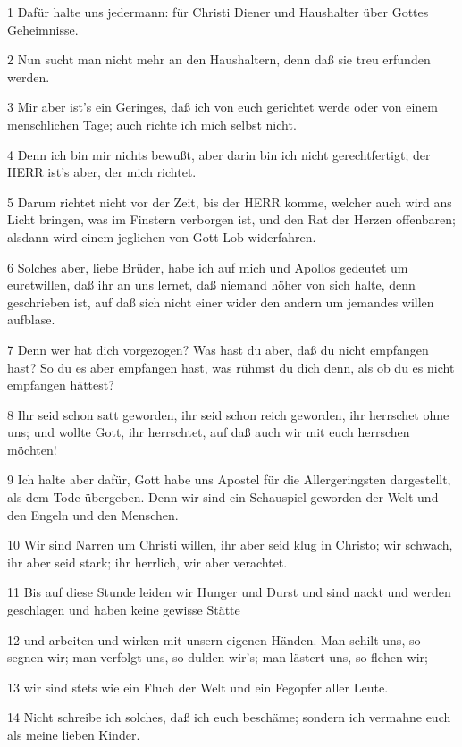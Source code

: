 \par 1 Dafür halte uns jedermann: für Christi Diener und Haushalter über Gottes Geheimnisse.
\par 2 Nun sucht man nicht mehr an den Haushaltern, denn daß sie treu erfunden werden.
\par 3 Mir aber ist's ein Geringes, daß ich von euch gerichtet werde oder von einem menschlichen Tage; auch richte ich mich selbst nicht.
\par 4 Denn ich bin mir nichts bewußt, aber darin bin ich nicht gerechtfertigt; der HERR ist's aber, der mich richtet.
\par 5 Darum richtet nicht vor der Zeit, bis der HERR komme, welcher auch wird ans Licht bringen, was im Finstern verborgen ist, und den Rat der Herzen offenbaren; alsdann wird einem jeglichen von Gott Lob widerfahren.
\par 6 Solches aber, liebe Brüder, habe ich auf mich und Apollos gedeutet um euretwillen, daß ihr an uns lernet, daß niemand höher von sich halte, denn geschrieben ist, auf daß sich nicht einer wider den andern um jemandes willen aufblase.
\par 7 Denn wer hat dich vorgezogen? Was hast du aber, daß du nicht empfangen hast? So du es aber empfangen hast, was rühmst du dich denn, als ob du es nicht empfangen hättest?
\par 8 Ihr seid schon satt geworden, ihr seid schon reich geworden, ihr herrschet ohne uns; und wollte Gott, ihr herrschtet, auf daß auch wir mit euch herrschen möchten!
\par 9 Ich halte aber dafür, Gott habe uns Apostel für die Allergeringsten dargestellt, als dem Tode übergeben. Denn wir sind ein Schauspiel geworden der Welt und den Engeln und den Menschen.
\par 10 Wir sind Narren um Christi willen, ihr aber seid klug in Christo; wir schwach, ihr aber seid stark; ihr herrlich, wir aber verachtet.
\par 11 Bis auf diese Stunde leiden wir Hunger und Durst und sind nackt und werden geschlagen und haben keine gewisse Stätte
\par 12 und arbeiten und wirken mit unsern eigenen Händen. Man schilt uns, so segnen wir; man verfolgt uns, so dulden wir's; man lästert uns, so flehen wir;
\par 13 wir sind stets wie ein Fluch der Welt und ein Fegopfer aller Leute.
\par 14 Nicht schreibe ich solches, daß ich euch beschäme; sondern ich vermahne euch als meine lieben Kinder.
